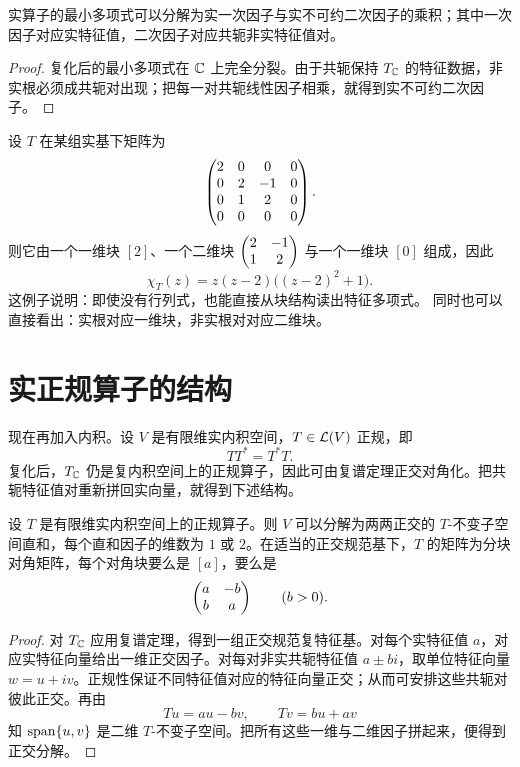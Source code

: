 \begin{corollary}
实算子的最小多项式可以分解为实一次因子与实不可约二次因子的乘积；其中一次因子对应实特征值，二次因子对应共轭非实特征值对。
\end{corollary}

\begin{proof}
复化后的最小多项式在 $\mathbb{C}$ 上完全分裂。由于共轭保持 $T_{\mathbb{C}}$ 的特征数据，非实根必须成共轭对出现；把每一对共轭线性因子相乘，就得到实不可约二次因子。
\end{proof}

\begin{example}
设 $T$ 在某组实基下矩阵为
\[
\begin{pmatrix} 2&0&0&0\\0&2&-1&0\\0&1&2&0\\0&0&0&0 \end{pmatrix}.
\]
则它由一个一维块 $[2]$、一个二维块 $\begin{pmatrix} 2&-1\\1&2 \end{pmatrix}$ 与一个一维块 $[0]$ 组成，因此
\[
\chi_T(z)=z(z-2)\big((z-2)^2+1\big).
\]
这例子说明：即使没有行列式，也能直接从块结构读出特征多项式。
同时也可以直接看出：实根对应一维块，非实根对对应二维块。
\end{example}

\section{实正规算子的结构}

现在再加入内积。设 $V$ 是有限维实内积空间，$T\in\mathcal{L}(V)$ 正规，即
\[
TT^*=T^*T.
\]
复化后，$T_{\mathbb{C}}$ 仍是复内积空间上的正规算子，因此可由复谱定理正交对角化。把共轭特征值对重新拼回实向量，就得到下述结构。

\begin{theorem}[实正规算子的正交分解]
设 $T$ 是有限维实内积空间上的正规算子。则 $V$ 可以分解为两两正交的 $T$-不变子空间直和，每个直和因子的维数为 $1$ 或 $2$。在适当的正交规范基下，$T$ 的矩阵为分块对角矩阵，每个对角块要么是 $[a]$，要么是
\[
\begin{pmatrix} a&-b\\b&a \end{pmatrix}\qquad(b>0).
\]
\end{theorem}

\begin{proof}
对 $T_{\mathbb{C}}$ 应用复谱定理，得到一组正交规范复特征基。对每个实特征值 $a$，对应实特征向量给出一维正交因子。对每对非实共轭特征值 $a\pm bi$，取单位特征向量 $w=u+iv$。正规性保证不同特征值对应的特征向量正交；从而可安排这些共轭对彼此正交。再由
\[
Tu=au-bv,\qquad Tv=bu+av
\]
知 $\operatorname{span}\{u,v\}$ 是二维 $T$-不变子空间。把所有这些一维与二维因子拼起来，便得到正交分解。
\end{proof}

